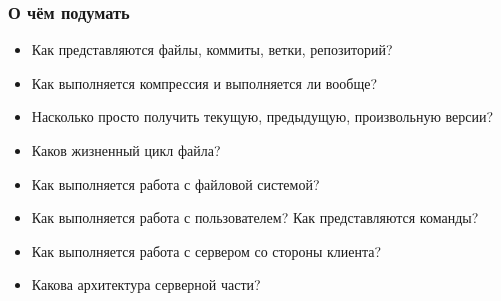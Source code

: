 \documentclass[xetex,mathserif,serif]{beamer}
\begin{document}
    \begin{frame}
        \frametitle{О чём подумать}
        \begin{itemize}
            \item Как представляются файлы, коммиты, ветки, репозиторий?
            \item Как выполняется компрессия и выполняется ли вообще? 
            \item Насколько просто получить текущую, предыдущую, произвольную версии?
            \item Каков жизненный цикл файла?
            \item Как выполняется работа с файловой системой?
            \item Как выполняется работа с пользователем? Как представляются команды?
            \item Как выполняется работа с сервером со стороны клиента?
            \item Какова архитектура серверной части?
        \end{itemize}
    \end{frame}
\end{document}
